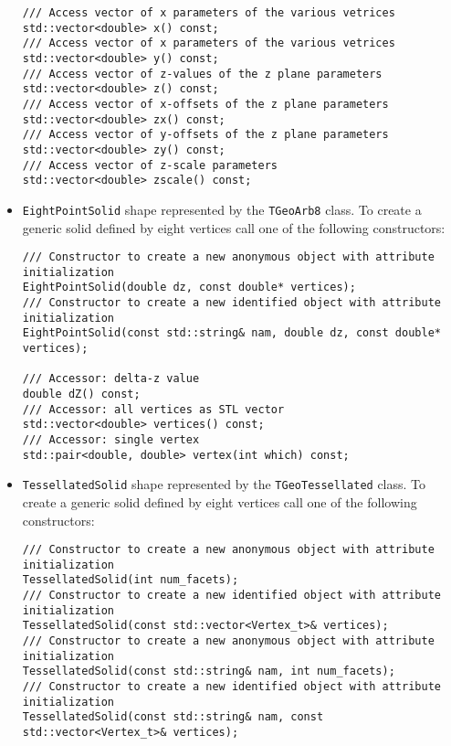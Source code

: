 \begin{itemize}
\begin{verbatim}
/// Access vector of x parameters of the various vetrices
std::vector<double> x() const;
/// Access vector of x parameters of the various vetrices
std::vector<double> y() const;
/// Access vector of z-values of the z plane parameters
std::vector<double> z() const;
/// Access vector of x-offsets of the z plane parameters
std::vector<double> zx() const;
/// Access vector of y-offsets of the z plane parameters
std::vector<double> zy() const;
/// Access vector of z-scale parameters
std::vector<double> zscale() const;
\end{verbatim}

\item \texttt{EightPointSolid} shape represented by the \texttt{TGeoArb8} class. To create a generic solid defined by eight vertices call one of the following constructors:
\begin{verbatim}
/// Constructor to create a new anonymous object with attribute initialization
EightPointSolid(double dz, const double* vertices);
/// Constructor to create a new identified object with attribute initialization
EightPointSolid(const std::string& nam, double dz, const double* vertices);

/// Accessor: delta-z value
double dZ() const;
/// Accessor: all vertices as STL vector
std::vector<double> vertices() const;
/// Accessor: single vertex
std::pair<double, double> vertex(int which) const;
\end{verbatim}

\item \texttt{TessellatedSolid} shape represented by the \texttt{TGeoTessellated} class. To create a generic solid defined by eight vertices call one of the following constructors:
\begin{verbatim}
/// Constructor to create a new anonymous object with attribute initialization
TessellatedSolid(int num_facets);
/// Constructor to create a new identified object with attribute initialization
TessellatedSolid(const std::vector<Vertex_t>& vertices);
/// Constructor to create a new anonymous object with attribute initialization
TessellatedSolid(const std::string& nam, int num_facets);
/// Constructor to create a new identified object with attribute initialization
TessellatedSolid(const std::string& nam, const std::vector<Vertex_t>& vertices);


\end{verbatim}
\end{itemize}
